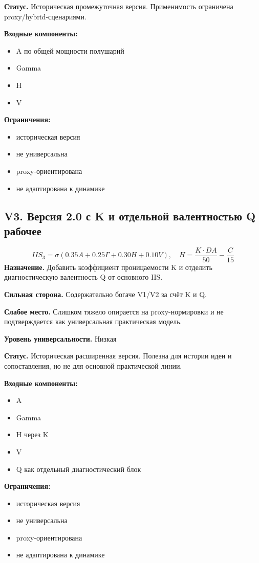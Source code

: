\documentclass[11pt,a4paper]{article}
\begin{document}
\textbf{Статус.} Историческая промежуточная версия. Применимость ограничена proxy/hybrid-сценариями.

\textbf{Входные компоненты:}
\begin{itemize}[leftmargin=1.2cm]
\item A по общей мощности полушарий
\item Gamma
\item H
\item V
\end{itemize}

\textbf{Ограничения:}
\begin{itemize}[leftmargin=1.2cm]
\item историческая версия
\item не универсальна
\item proxy-ориентирована
\item не адаптирована к динамике
\end{itemize}


\subsection*{V3. Версия 2.0 с K и отдельной валентностью Q \textcolor{green!20!black}{\textbf{рабочее}}}
\[
IIS_3=\sigma(0.35A+0.25\Gamma+0.30H+0.10V),\quad H=\frac{K\cdot DA}{50}-\frac{C}{15}
\]
\textbf{Назначение.} Добавить коэффициент проницаемости K и отделить диагностическую валентность Q от основного IIS.

\textbf{Сильная сторона.} Содержательно богаче V1/V2 за счёт K и Q.

\textbf{Слабое место.} Слишком тяжело опирается на proxy-нормировки и не подтверждается как универсальная практическая модель.

\textbf{Уровень универсальности.} Низкая

\textbf{Статус.} Историческая расширенная версия. Полезна для истории идеи и сопоставления, но не для основной практической линии.

\textbf{Входные компоненты:}
\begin{itemize}[leftmargin=1.2cm]
\item A
\item Gamma
\item H через K
\item V
\item Q как отдельный диагностический блок
\end{itemize}

\textbf{Ограничения:}
\begin{itemize}[leftmargin=1.2cm]
\item историческая версия
\item не универсальна
\item proxy-ориентирована
\item не адаптирована к динамике
\end{itemize}
\end{document}
